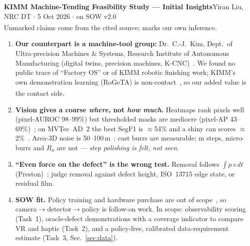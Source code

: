 \documentclass[10pt,a4paper]{article}
\newcommand{\um}{\,\textmu m}
\newcommand{\infr}{\textsuperscript{\textcolor{cB}{\dag}}}
\begin{document}
\small

{\sffamily\bfseries\large KIMM Machine-Tending Feasibility Study --- Initial Insights}\hfill{\footnotesize Yiran Liu, NRC DT $\cdot$ 5 Oct 2026 $\cdot$ on SOW v2.0}\\[1pt]
{\footnotesize\textcolor{ink2}{Unmarked claims come from the cited source; \infr{} marks our own inference.}}

\begin{tcolorbox}[enhanced, colback=cA!5, colframe=cA, boxrule=0.5pt, arc=2pt, left=4pt, right=4pt, top=2pt, bottom=2pt]
\begin{enumerate}[label=\textbf{\arabic*.}]
\item \textbf{Our counterpart is a machine-tool group:} Dr.\ C.-J.\ Kim, Dept.\ of Ultra-precision Machines \& Systems, Research Institute of Autonomous Manufacturing (digital twins, precision machines, K-CNC)~\cite{kimmorg,kimmko,kcnc}.
We found no public trace of ``Factory OS'' or of KIMM robotic finishing work; KIMM's own demonstration learning (RoGeTA) is non-contact~\cite{rogeta}, so our added value is the contact side.\infr
\item \textbf{Vision gives a coarse \emph{where}, not \emph{how much}.}
Heatmaps rank pixels well (pixel-AUROC 98--99\%) but thresholded masks are mediocre (pixel-AP 43--69\%)~\cite{dinomaly}; on MVTec~AD~2 the best SegF1 is $\approx$54\% and a shiny can scores $\approx$2\%~\cite{vand3,robis}.
Area-3D noise is 50--100\um~\cite{zivid,photoneo}: cast burrs are measurable; \textmu m steps, micro-burrs and $R_a$ are not --- \emph{step polishing is felt, not seen}.
\item \textbf{``Even force on the defect'' is the wrong test.}
Removal follows $\int p\,v\,dt$ (Preston)~\cite{preston}; judge removal against defect height, ISO~13715 edge state, or residual film.
\item \textbf{SOW fit.}
Policy training and hardware purchase are out of scope~\cite{sow}, so camera$\to$detector$\to$policy is follow-on work.
In scope: observability scoring (Task~1), oracle-defect demonstrations with a coverage indicator to compare VR and haptic (Task~2), and a policy-free, calibrated data-requirement estimate (Task~3, Sec.~\ref{sec:data}).
\end{enumerate}
\end{tcolorbox}
\end{document}
